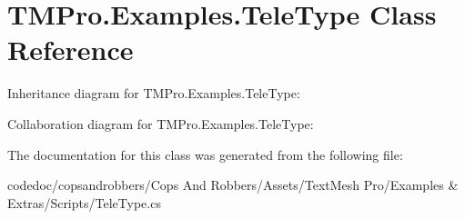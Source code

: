 \hypertarget{classTMPro_1_1Examples_1_1TeleType}{}\section{T\+M\+Pro.\+Examples.\+Tele\+Type Class Reference}
\label{classTMPro_1_1Examples_1_1TeleType}


Inheritance diagram for T\+M\+Pro.\+Examples.\+Tele\+Type\+:


Collaboration diagram for T\+M\+Pro.\+Examples.\+Tele\+Type\+:


The documentation for this class was generated from the following file\+:\begin{DoxyCompactItemize}
\item 
codedoc/copsandrobbers/\+Cops And Robbers/\+Assets/\+Text\+Mesh Pro/\+Examples \& Extras/\+Scripts/Tele\+Type.\+cs\end{DoxyCompactItemize}

